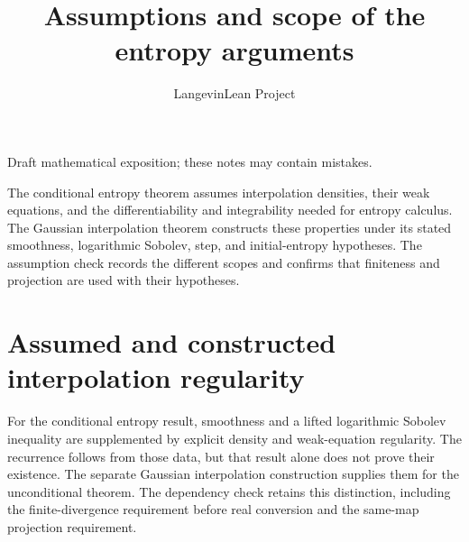\documentclass[11pt,a4paper]{article}
\title{\texorpdfstring{Assumptions and scope of the entropy arguments}{Assumptions and scope of the entropy arguments}}
\author{LangevinLean Project}
\date{}
\begin{document}
\maketitle
Draft mathematical exposition; these notes may contain mistakes.


The conditional entropy theorem assumes interpolation densities, their weak equations, and the differentiability and integrability needed for entropy calculus. The Gaussian interpolation theorem constructs these properties under its stated smoothness, logarithmic Sobolev, step, and initial-entropy hypotheses. The assumption check records the different scopes and confirms that finiteness and projection are used with their hypotheses.


\section{\texorpdfstring{Assumed and constructed interpolation regularity}{Assumed and constructed interpolation regularity}}


For the conditional entropy result, smoothness and a lifted logarithmic Sobolev inequality are supplemented by explicit density and weak-equation regularity. The recurrence follows from those data, but that result alone does not prove their existence. The separate Gaussian interpolation construction supplies them for the unconditional theorem. The dependency check retains this distinction, including the finite-divergence requirement before real conversion and the same-map projection requirement.
\end{document}
